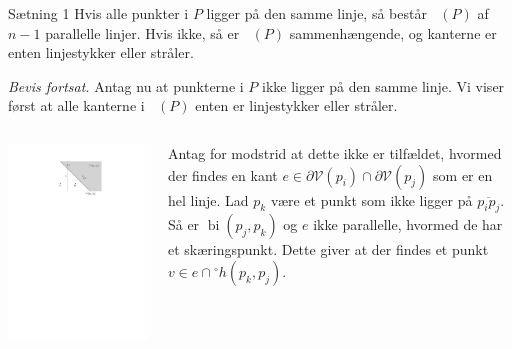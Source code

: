 \documentclass{beamer} %
\DeclareMathOperator{\VorG}{Vor_{G}}
\DeclareMathOperator{\bi}{bi}
\begin{document}
\begin{frame}
\begin{block}{Sætning 1}
Hvis alle punkter i $P$ ligger på den samme linje, så består $\VorG(P)$ af $n - 1$ parallelle linjer.
Hvis ikke, så er $\VorG(P)$ sammenhængende, og kanterne er enten linjestykker eller stråler.
\end{block}
\textit{Bevis fortsat.} \pause Antag nu at punkterne i $P$ ikke ligger på den samme linje. \pause Vi viser først at alle kanterne i $\VorG(P)$ enten er linjestykker eller stråler. \pause
\vspace{0.5em}
\begin{columns}
\begin{column}{0.5\textwidth}
	\begin{center}
		\includegraphics[scale=0.8]{../images/diagram_is_connected}
	\end{center}
\end{column}
\begin{column}{0.5\textwidth}
    Antag for modstrid at dette ikke er tilfældet\pause, hvormed der findes en kant $e \in \partial \mathcal{V}(p_i) \cap \partial \mathcal{V}(p_j)$ som er en hel linje. \pause Lad $p_k$ være et punkt som ikke ligger på $\overline{p_i p_j}$. \pause Så er $\bi(p_j, p_k)$ og $e$ ikke parallelle\pause, hvormed de har et skæringspunkt. \pause Dette giver at der findes et punkt $v \in e \cap {}^{\circ}h(p_k, p_j)$.
\end{column}
\end{columns}
\end{frame}
\end{document}
